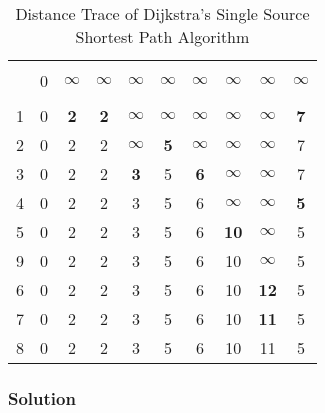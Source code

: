 \begin{table}[H]
\begin{center}
\begin{tabular}{c|ccccccccc}
\hline \\[-0.97em]
  & 0 &  $\infty$  &  $\infty$  &  $\infty$  &  $\infty$  &  $\infty$  &   $\infty$  &   $\infty$  &  $\infty$  \\
\hline \\[-0.9em]
1 & 0 & \textbf{2} & \textbf{2} &  $\infty$  &  $\infty$  &  $\infty$  &   $\infty$  &   $\infty$  & \textbf{7} \\
2 & 0 &         2  &         2  &  $\infty$  & \textbf{5} &  $\infty$  &   $\infty$  &   $\infty$  &         7  \\
3 & 0 &         2  &         2  & \textbf{3} &         5  & \textbf{6} &   $\infty$  &   $\infty$  &         7  \\
4 & 0 &         2  &         2  &         3  &         5  &         6  &   $\infty$  &   $\infty$  & \textbf{5} \\
5 & 0 &         2  &         2  &         3  &         5  &         6  & \textbf{10} &   $\infty$  &         5  \\
9 & 0 &         2  &         2  &         3  &         5  &         6  &         10  &   $\infty$  &         5  \\
6 & 0 &         2  &         2  &         3  &         5  &         6  &         10  & \textbf{12} &         5  \\
7 & 0 &         2  &         2  &         3  &         5  &         6  &         10  & \textbf{11} &         5  \\
8 & 0 &         2  &         2  &         3  &         5  &         6  &         10  &         11  &         5  \\
\end{tabular}
\end{center}
\caption{Distance Trace of Dijkstra's Single Source Shortest Path Algorithm}
\end{table}

\subsubsection*{Solution}

